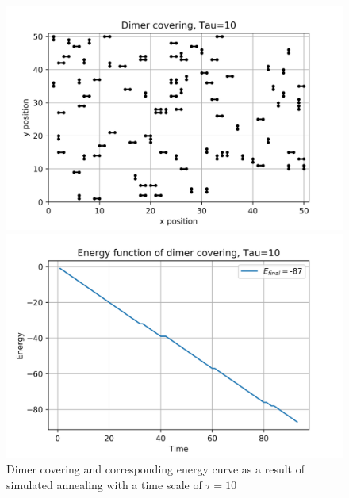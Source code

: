 \documentclass{article}
\begin{document}
\begin{figure}[H]
	\begin{minipage}{0.49\linewidth}
		\includegraphics[width=\linewidth]{../images/q4_dimers_t=1e1.png}
	\end{minipage}
	\begin{minipage}{0.49\linewidth}
		\includegraphics[width=\linewidth]{../images/q4_energy_t=1e1.png}
	\end{minipage}
	\caption{Dimer covering and corresponding energy curve as a result of simulated annealing with a time scale of $\tau = 10$}
	\label{fig:q4_dimers_t=1e1}
\end{figure}
\end{document}
